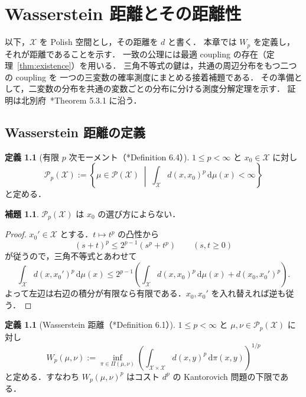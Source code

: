 \documentclass[12pt,a4j,twoside]{jreport}
\numberwithin{equation}{chapter}
\theoremstyle{definition} %
\newtheorem{lem}[thm]{補題}
\newtheorem{dfn}[thm]{定義}
\newcommand{\X}{\mathcal{X}}
\newcommand{\Prob}{\mathcal{P}}
\newcommand{\Pp}[1]{\mathcal{P}_{#1}}
\newcommand{\Couplings}{\Pi}
\newcommand{\Wass}{W}
\renewcommand{\d}{\mathrm{d}} %
\begin{document}
\chapter{Wasserstein 距離とその距離性}
\label{ch:metric}

以下，$\X$ を Polish 空間とし，その距離を $d$ と書く．
本章では $\Wass_p$ を定義し，それが距離であることを示す．
一致の公理には最適 coupling の存在（定理~\ref{thm:existence}）を用いる．
三角不等式の鍵は，共通の周辺分布をもつ二つの coupling を
一つの三変数の確率測度にまとめる接着補題である．
その準備として，二変数の分布を共通の変数ごとの分布に分ける測度分解定理を示す．
証明は北別府~\cite{Kitabeppu}*{Theorem 5.3.1} に沿う．

\section{Wasserstein 距離の定義}

\begin{dfn}[有限 $p$ 次モーメント（\cite{Villani}*{Definition 6.4}）]\label{dfn:pp}
  $1\leq p<\infty$ と $x_0\in\X$ に対し
  \[
    \Pp{p}(\X)
    :=
    \left\{
      \mu\in\Prob(\X)
      \;\middle|\;
      \int_\X d(x,x_0)^p\,\d\mu(x)<\infty
    \right\}
  \]
  と定める．
\end{dfn}

\begin{lem}\label{lem:pp-indep}
  $\Pp{p}(\X)$ は $x_0$ の選び方によらない．
\end{lem}

\begin{proof}
  $x_0'\in\X$ とする．$t\mapsto t^p$ の凸性から
  \[
    (s+t)^p\leq2^{p-1}(s^p+t^p)\qquad(s,t\geq0)
  \]
  が従うので，三角不等式とあわせて
  \[
    \int_\X d(x,x_0')^p\,\d\mu(x)
    \leq2^{p-1}\left(\int_\X d(x,x_0)^p\,\d\mu(x)+d(x_0,x_0')^p\right).
  \]
  よって左辺は右辺の積分が有限なら有限である．$x_0,x_0'$ を入れ替えれば逆も従う．
\end{proof}

\begin{dfn}[Wasserstein 距離（\cite{Villani}*{Definition 6.1}）]\label{dfn:wasserstein}
  $1\leq p<\infty$ と $\mu,\nu\in\Pp{p}(\X)$ に対し
  \[
    \Wass_p(\mu,\nu)
    :=
    \inf_{\pi\in\Couplings(\mu,\nu)}
    \left(\int_{\X\times\X}d(x,y)^p\,\d\pi(x,y)\right)^{1/p}
  \]
  と定める．すなわち $\Wass_p(\mu,\nu)^p$ はコスト $d^p$ の Kantorovich 問題の下限である．
\end{dfn}
\end{document}

